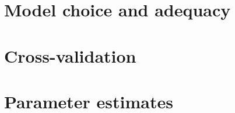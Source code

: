 \documentclass[12pt,letterpaper]{article}
\begin{document}
\section{Model choice and adequacy}






\section{Cross-validation}




\section{Parameter estimates}




\end{document}
